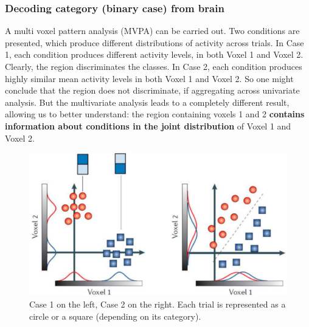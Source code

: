 \subsubsection{Decoding category (binary case) from brain}
A multi voxel pattern analysis (MVPA) can be carried out.
Two conditions are presented, which produce different distributions of activity across trials. In Case 1, each condition produces different activity levels, in both Voxel 1 and Voxel 2. Clearly, the region discriminates the classes.
In Case 2, each condition produces highly similar mean activity levels in both Voxel 1 and Voxel 2. So one might conclude that the region does not discriminate, if aggregating across univariate analysis.
But the multivariate analysis leads to a completely different result, allowing us to better understand: the region containing voxels 1 and 2 \textbf{contains information about conditions in the joint distribution} of Voxel 1 and Voxel 2.
\begin{figure}[!ht]
    \centering
    \captionsetup{width=.8\linewidth}
    \includegraphics[width=0.5\linewidth]{images/mvpa.png}
    \caption{Case 1 on the left, Case 2 on the right. Each trial is represented as a circle or a square (depending on its category).}
    \label{fig:multivariate}
\end{figure}
